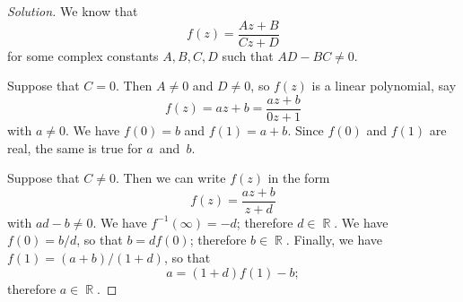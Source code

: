 \documentclass{amsproc}
\theoremstyle{definition}
\newenvironment{solution}{\begin{proof}[Solution]}{\end{proof}}
\theoremstyle{remark}
\DeclareMathOperator{\R}{\mathbb{R}}
\numberwithin{equation}{section}
\begin{document}
\begin{solution}
We know that
$$
f(z) = \dfrac{Az + B}{Cz + D}
$$
for some complex constants $ A,B,C,D $ such that $ AD - BC \neq 0 $.

Suppose that $ C = 0 $. Then $ A \neq 0 $ and $ D \neq 0 $, so $ f(z) $ is a linear polynomial, say
$$
f(z) = az + b = \dfrac{az + b}{0z + 1}
$$
with $ a \neq 0 $. We have $ f(0) = b $ and $ f(1) = a + b $. Since $ f(0) $ and $ f(1) $ are real, the same is true for $ a $~and~$ b $.

Suppose that $ C \neq 0 $. Then we can write $ f(z) $ in the form
$$
f(z) = \dfrac{az + b}{z + d}
$$
with $ ad - b \neq 0 $. We have $ f^{-1}(\infty) = -d $; therefore $ d \in \R $. We have $ f(0) = b/d $, so that $ b = d f(0) $; therefore $ b \in \R $. Finally, we
have $ f(1) = (a + b)/(1 + d) $, so that
$$
a = (1 + d)f(1) - b;
$$
therefore $ a \in \R $.
\end{solution}
\end{document}
